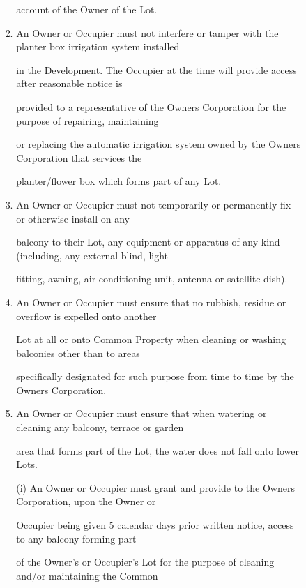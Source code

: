 \documentclass{article}
\begin{document}
\begin{enumerate}[label=\arabic*.]
\begin{enumerate}[label=\arabic{enumi}.\arabic*.]
\begin{enumerate}[label=(\arabic*)]
\begin{enumerate}[label=(\alph*)]
{\fontsize{10.02}{1}account of the Owner of the Lot. }

\item {\fontsize{9.962}{1} An Owner or Occupier must not interfere or tamper with the planter box irrigation system installed }

{\fontsize{10.02}{1}in the Development. The Occupier at the time will provide access after reasonable notice is }

{\fontsize{10.02}{1}provided to a representative of the Owners Corporation for the purpose of repairing, maintaining }

{\fontsize{10.02}{1}or replacing the automatic irrigation system owned by the Owners Corporation that services the }

\newpage

{\fontsize{10.02}{1}planter/flower box which forms part of any Lot. }

\item {\fontsize{9.962}{1} An Owner or Occupier must not temporarily or permanently fix or otherwise install on any }

{\fontsize{10.02}{1}balcony to their Lot, any equipment or apparatus of any kind (including, any external blind, light }

{\fontsize{10.02}{1}fitting, awning, air conditioning unit, antenna or satellite dish). }

\item {\fontsize{9.962}{1} An Owner or Occupier must ensure that no rubbish, residue or overflow is expelled onto another }

{\fontsize{10.02}{1}Lot at all or onto Common Property when cleaning or washing balconies other than to areas }

{\fontsize{10.02}{1}specifically designated for such purpose from time to time by the Owners Corporation. }

\item {\fontsize{9.962}{1} An Owner or Occupier must ensure that when watering or cleaning any balcony, terrace or garden }

{\fontsize{10.02}{1}area that forms part of the Lot, the water does not fall onto lower Lots. }

{\fontsize{9.962}{1}(i) An Owner or Occupier must grant and provide to the Owners Corporation, upon the Owner or }

{\fontsize{10.02}{1}Occupier being given 5 calendar days prior written notice, access to any balcony forming part }

{\fontsize{10.02}{1}of the Owner's or Occupier's Lot for the purpose of cleaning and/or maintaining the Common }


\end{enumerate}
\end{enumerate}
\end{enumerate}
\end{enumerate}
\end{document}
